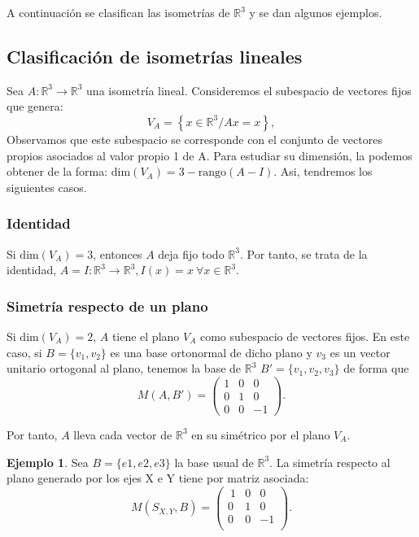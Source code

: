 \documentclass[11pt]{article}
\theoremstyle{definition}
\newtheorem{ejemplo}{Ejemplo}[section]
\begin{document}

	A continuación se clasifican las isometrías de $\mathbb R^3$ y se dan algunos ejemplos.

    \subsection{Clasificación de isometrías lineales}
Sea $A:\mathbb R^3\rightarrow\mathbb R^3$ una isometría lineal. Consideremos el subespacio de vectores fijos que genera:
\[V_A=\left\{x\in\mathbb R^3/Ax=x \right\},\]
Observamos que este subespacio se corresponde con el conjunto de vectores propios asociados al valor propio 1 de A. Para estudiar su dimensión, la podemos obtener de la forma: $\mathrm{dim}(V_A)=3-\text{rango}(A-I)$. Asi, tendremos los siguientes casos.

    \subsubsection{Identidad}
    Si $\mathrm{dim}(V_A)=3$, entonces $A$ deja fijo todo $\mathbb R^3$. Por tanto, se trata de la identidad,  $A=I:\mathbb R^3\rightarrow \mathbb R^3, I(x)=x\ \forall x\in \mathbb R^3$.

    \subsubsection{Simetría respecto de un plano}
  	Si $\mathrm{dim}(V_A)=2$, $A$ tiene el plano $V_A$ como subespacio de vectores fijos. En este caso, si $B=\{v_1, v_2\}$ es una base ortonormal de dicho plano y $v_3$ es un vector unitario ortogonal al plano, tenemos la base de $\mathbb{R}^3$ $B'=\{v_1,v_2,v_3\}$ de forma que
    \[M(A, B')=\begin{pmatrix}1&0&0\\0&1&0\\0&0&-1\end{pmatrix}.\]

    Por tanto, $A$ lleva cada vector de $\mathbb R^3$ en su simétrico por el plano $V_A$.

\begin{ejemplo}
Sea $B=\{e1 , e2 , e3\}$ la base usual de  $\mathbb{R}^3$. La simetría respecto al plano generado por los ejes X e Y tiene por matriz asociada:
\[M(S_{X,Y},B)=
    \begin{pmatrix}
    \ 1 & 0 & 0 \\ 0 & 1 & 0 \\ 0 & 0 & -1 \\
    \end{pmatrix}.
  \]
\end{ejemplo}
\end{document}

